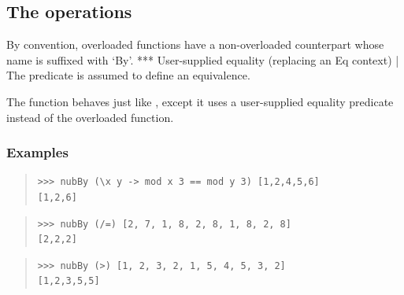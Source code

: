 \subsection{The  operations}
By convention, overloaded functions have a non-overloaded counterpart
 whose name is suffixed with ‘By’.
 *** User-supplied equality (replacing an Eq context)
 | The predicate is assumed to define an equivalence.\par
\begin{haddockdesc}
\item[\begin{tabular}{@{}l}
nubBy :: (a -> a -> Bool) -> {\char 91}a{\char 93} -> {\char 91}a{\char 93}
\end{tabular}]
{\haddockbegindoc
The  function behaves just like , except it uses a
 user-supplied equality predicate instead of the overloaded \haddockid{(==)}
 function.\par
\subsubsection*{\textbf{Examples}}
\begin{quote}
{\haddockverb\begin{verbatim}
>>> nubBy (\x y -> mod x 3 == mod y 3) [1,2,4,5,6]
[1,2,6]

\end{verbatim}}
\end{quote}
\begin{quote}
{\haddockverb\begin{verbatim}
>>> nubBy (/=) [2, 7, 1, 8, 2, 8, 1, 8, 2, 8]
[2,2,2]

\end{verbatim}}
\end{quote}
\begin{quote}
{\haddockverb\begin{verbatim}
>>> nubBy (>) [1, 2, 3, 2, 1, 5, 4, 5, 3, 2]
[1,2,3,5,5]

\end{verbatim}}
\end{quote}}
\end{haddockdesc}

